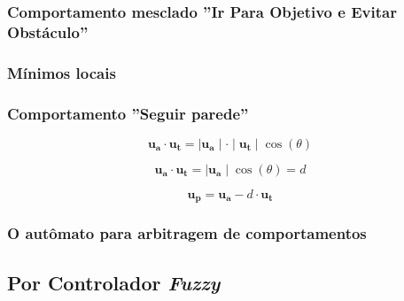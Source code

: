 		
		
		\subsubsection{Comportamento mesclado ''Ir Para Objetivo e Evitar Obstáculo''}
		
		\subsubsection{Mínimos locais}
		
		
		
		\subsubsection{Comportamento ''Seguir parede''}
		
		
		
		
		
		\begin{equation}
			\label{eq:vetorPerpendicularSP1}
			\mathbf{u_a} \cdot \mathbf{u_t} = \mid \mathbf{u_a} \mid \cdot \mid \mathbf{u_t} \mid \cos(\theta)
		\end{equation}
		
		\begin{equation}
			\label{eq:vetorPerpendicularSP2}
			\mathbf{u_a} \cdot \mathbf{u_t} = \mid \mathbf{u_a} \mid \cos(\theta) = d
		\end{equation}
		
		\begin{equation}
			\label{eq:vetorPerpendicularSP3}
			\mathbf{u_p} = \mathbf{u_a} - d \cdot \mathbf{u_t}
		\end{equation}
		
		\subsubsection{O autômato para arbitragem de comportamentos}
	
		
	
		
		
		
	
	\subsection{Por Controlador \textit{Fuzzy}}
	
